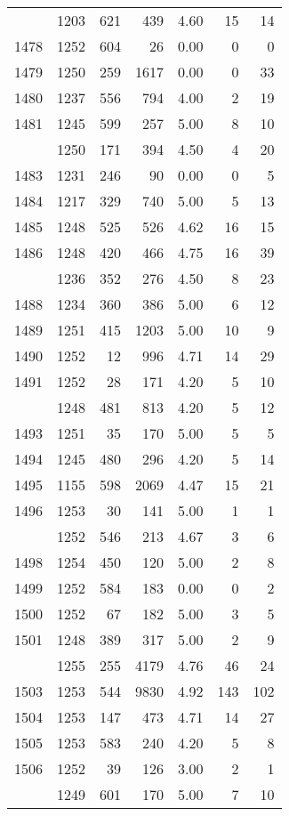 \documentclass[
]{article}
\begin{document}
\begin{table}
\begin{tabular}[t]{lrrrrrr}
\addlinespace
1477 & 1203 & 621 & 439 & 4.60 & 15 & 14\\
1478 & 1252 & 604 & 26 & 0.00 & 0 & 0\\
1479 & 1250 & 259 & 1617 & 0.00 & 0 & 33\\
1480 & 1237 & 556 & 794 & 4.00 & 2 & 19\\
1481 & 1245 & 599 & 257 & 5.00 & 8 & 10\\
\addlinespace
1482 & 1250 & 171 & 394 & 4.50 & 4 & 20\\
1483 & 1231 & 246 & 90 & 0.00 & 0 & 5\\
1484 & 1217 & 329 & 740 & 5.00 & 5 & 13\\
1485 & 1248 & 525 & 526 & 4.62 & 16 & 15\\
1486 & 1248 & 420 & 466 & 4.75 & 16 & 39\\
\addlinespace
1487 & 1236 & 352 & 276 & 4.50 & 8 & 23\\
1488 & 1234 & 360 & 386 & 5.00 & 6 & 12\\
1489 & 1251 & 415 & 1203 & 5.00 & 10 & 9\\
1490 & 1252 & 12 & 996 & 4.71 & 14 & 29\\
1491 & 1252 & 28 & 171 & 4.20 & 5 & 10\\
\addlinespace
1492 & 1248 & 481 & 813 & 4.20 & 5 & 12\\
1493 & 1251 & 35 & 170 & 5.00 & 5 & 5\\
1494 & 1245 & 480 & 296 & 4.20 & 5 & 14\\
1495 & 1155 & 598 & 2069 & 4.47 & 15 & 21\\
1496 & 1253 & 30 & 141 & 5.00 & 1 & 1\\
\addlinespace
1497 & 1252 & 546 & 213 & 4.67 & 3 & 6\\
1498 & 1254 & 450 & 120 & 5.00 & 2 & 8\\
1499 & 1252 & 584 & 183 & 0.00 & 0 & 2\\
1500 & 1252 & 67 & 182 & 5.00 & 3 & 5\\
1501 & 1248 & 389 & 317 & 5.00 & 2 & 9\\
\addlinespace
1502 & 1255 & 255 & 4179 & 4.76 & 46 & 24\\
1503 & 1253 & 544 & 9830 & 4.92 & 143 & 102\\
1504 & 1253 & 147 & 473 & 4.71 & 14 & 27\\
1505 & 1253 & 583 & 240 & 4.20 & 5 & 8\\
1506 & 1252 & 39 & 126 & 3.00 & 2 & 1\\
\addlinespace
1507 & 1249 & 601 & 170 & 5.00 & 7 & 10\\

\end{tabular}
\end{table}
\end{document}
